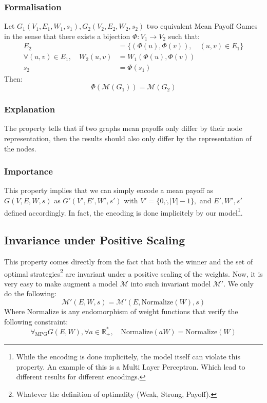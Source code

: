 \subsubsection{Formalisation}
Let $G_1(V_1,E_1,W_1,s_1),G_2(V_2,E_2,W_2,s_2)$ two equivalent Mean Payoff Games in the sense that there exists a bijection $\Phi:V_1\rightarrow V_2$ such that:
\begin{align*}
	E_2&=\{(\Phi(u),\Phi(v)),\quad (u,v)\in E_1\}\\
	\forall (u,v)\in E_1,\quad W_2(u,v)&=W_1(\Phi(u),\Phi(v)) \\
	s_2&= \Phi(s_1)
\end{align*}
Then:
$$
\Phi\left(\mathcal{M}(G_1)\right) = \mathcal{M}(G_2)
$$
\subsubsection{Explanation}
The property tells that if two graphs mean payoffs only differ by their node representation, then the results should also only differ by the representation of the nodes.
\subsubsection{Importance}
This property implies that we can simply encode a mean payoff as $G(V,E,W,s)$ as $G'(V',E',W',s')$ with  $V'=\{0,\dot,\lvert V \rvert-1\},$ and $E',W',s'$ defined accordingly.
\newline In fact, the encoding is done implicitely by our model\footnote{While the encoding is done implicitely, the model itself can violate this property. An example of this is a Multi Layer Perceptron. Which lead to different results for different encodings.}.

\subsection{Invariance under Positive Scaling}
This property comes directly from the fact that both the winner and the set of optimal strategies\footnote{Whatever the definition of optimality (Weak, Strong, Payoff).} are invariant under a positive scaling of the weights.
\newline
Now, it is very easy to make augment a model $\mathcal{M}$ into such invariant model $\mathcal{M}'.$ We only do the following:
$$
\mathcal{M}'(E,W,s)=\mathcal{M}'(E,\text{Normalize}(W),s)
$$
Where $\text{Normalize}$ is any endomorphism of weight functions that verify the following constraint:
$$
\forall_{\text{MPG}}G(E,W),\forall a\in\mathbb{R}_+^*,\quad \text{Normalize}(aW)=\text{Normalize}(W)
$$

